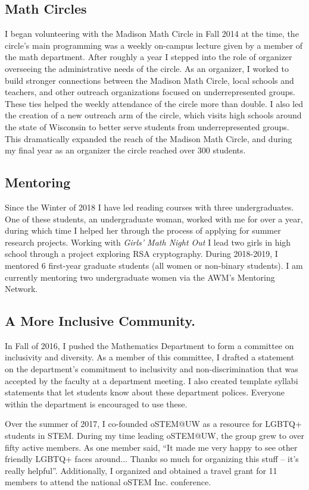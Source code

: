 \documentclass[11pt,reqno]{amsart}
\theoremstyle{remark}
\begin{document}
\subsection{Math Circles}
I began volunteering with the Madison Math Circle in Fall 2014 at the time, the circle's main programming was a weekly on-campus lecture given by a member of the math department. After roughly a year I stepped into the role of organizer overseeing the administrative needs of the circle. As an organizer, I worked to build stronger connections between the Madison Math Circle, local schools and teachers, and other outreach organizations focused on underrepresented groups. These ties helped the weekly attendance of the circle more than double. I also led the creation of a new outreach arm of the circle, which visits high schools around the state of Wisconsin to better serve students from underrepresented groups. This dramatically expanded the reach of the Madison Math Circle, and during my final year as an organizer the circle reached over 300 students.

\subsection{Mentoring}
Since the Winter of 2018 I have led reading courses with three undergraduates. One of these students, an undergraduate woman, worked with me for over a year, during which time I helped her through the process of applying for summer research projects. Working with \textit{Girls' Math Night Out} I lead two girls in high school through a project exploring RSA cryptography. During 2018-2019, I mentored 6 first-year graduate students (all women or non-binary students). I am currently mentoring two undergraduate women via the AWM's Mentoring Network. 


\subsection{A More Inclusive Community.} In Fall of 2016, I pushed the Mathematics Department to form a committee on inclusivity and diversity. As a member of this committee, I drafted a statement on the department's commitment to inclusivity and non-discrimination that was accepted by the faculty at a department meeting. I also created template syllabi statements that let students know about these department polices. Everyone within the department is encouraged to use these. 

Over the summer of 2017, I co-founded oSTEM@UW as a resource for LGBTQ+ students in STEM. During my time leading oSTEM@UW, the group grew to over fifty active members. As one member said, ``It made me very happy to see other friendly LGBTQ+ faces around... Thanks so much for organizing this stuff -- it's really helpful''. Additionally, I organized and obtained a travel grant for 11 members to attend the national oSTEM Inc. conference. 
\end{document}
